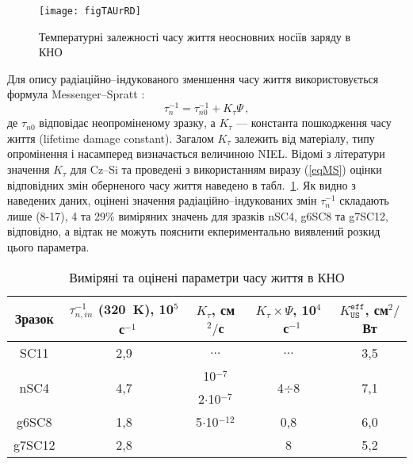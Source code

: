\begin{figure}
\center
\texttt{[image: figTAUrRD]}
\caption{\label{figTAUrRD}
Температурні залежності часу життя неосновних носіїв заряду в КНО
\FigCaptionSSCRD
}%
\end{figure}

Для опису радіаційно--індукованого зменшення часу життя використовується формула Messenger--Spratt \cite{Markvart}:
\begin{equation}
\label{eqMS}
\tau_n^{-1}=\tau_{n0}^{-1}+K_\tau\Psi\,,
\end{equation}
де
$\tau_{n0}$ відповідає неопроміненому зразку, а
$K_\tau$ --- константа пошкодження часу життя (lifetime damage constant).
Загалом $K_\tau$ залежить від матеріалу, типу опромінення і насамперед визначається величиною NIEL.
Відомі з літератури значення $K_\tau$ для Cz--Si та проведені з використанням виразу (\ref{eqMS}) оцінки відповідних
змін оберненого часу життя наведено в табл.~\ref{tabTAUn}.
Як видно з наведених даних, оцінені значення радіаційно--індукованих змін $\tau_n^{-1}$ складають лише
(8-17), 4 та 29\% виміряних значень для зразків nSC4, g6SC8 та g7SC12, відповідно, а відтак не можуть
пояснити екпериментально виявлений розкид цього параметра.

\begin{table}[b]
\caption{\label{tabTAUn}Виміряні та оцінені параметри часу життя в КНО
}
\center
\begin{tabular}{|c|c|c|c|c|}
\hline
Зразок &$\tau_{n,in}^{-1}$ (320~K), 10$^5$~с$^{-1}$&$K_\tau$, см$^2/$с&$K_\tau\times\Psi$, 10$^4$~с$^{-1}$&$K_\mathtt{US}^\mathtt{eff}$, см$^2/$Вт\\ \hline
SC11&2,9&$\ldots$&$\ldots$&3,5\\ \hline
\multirow{2}{*}{nSC4}&\multirow{2}{*}{4,7}&10$^{-7}$ \cite{NIEL:Jafari}&\multirow{2}{*}{4$\div$8}&\multirow{2}{*}{7,1}\\ %
&&2$\cdot$10$^{-7}$ \cite{n:Gaubas}&&\\ \hline
g6SC8&1,8&5$\cdot$10$^{-12}$&0,8&6,0\\ \cline{1-2} \cline{4-5}%
g7SC12&2,8& \cite{NIEL:Jafari,gamma:Kolkov} &8&5,2\\ \hline
\end{tabular}
\end{table}

